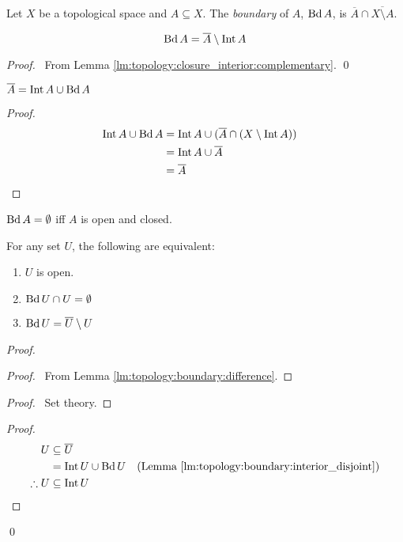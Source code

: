 \begin{df}[Boundary]
  Let $X$ be a topological space and $A \subseteq X$. The \emph{boundary} of
  $A$, $\operatorname{Bd} A$, is $\overline{A} \cap \overline{X \setminus A}$.
\end{df}

\begin{lm}
  \label{lm:topology:boundary:difference}
  \[ \operatorname{Bd} A = \overline{A} \setminus \operatorname{Int} A \]
\end{lm}

\begin{proof}
  \pf\ From Lemma \ref{lm:topology:closure_interior:complementary}. \qed
\end{proof}

\begin{lm}
  \label{lm:topology:boundary:interior_disjoint}
  $\overline{A} = \operatorname{Int} A \cup \operatorname{Bd} A$
\end{lm}

\begin{proof}
  \pf
  \begin{align*}
    \operatorname{Int} A \cup \operatorname{Bd} A & = \operatorname{Int} A \cup (\overline{A} \cap (X \setminus \operatorname{Int}
    A))
    \\
    & = \operatorname{Int} A \cup \overline{A} \\
    & = \overline{A} & \relax
  \end{align*}
\end{proof}

\begin{cor}
  $\operatorname{Bd} A = \emptyset$ iff $A$ is open and closed.
\end{cor}

\begin{lm}
  For any set $U$, the following are equivalent:
  \begin{enumerate}
    \item $U$ is open.
    \item $\operatorname{Bd} U \cap U = \emptyset$
    \item $\operatorname{Bd} U = \overline{U} \setminus U$
  \end{enumerate}
\end{lm}

\begin{proof}
  \pf
  \begin{proof}
    \pf\ From Lemma \ref{lm:topology:boundary:difference}.
  \end{proof}
  \begin{proof}
    \pf\ Set theory.
  \end{proof}
  \begin{proof}
    \pf
    \begin{align*}
      U & \subseteq \overline{U} \\
      & = \operatorname{Int} U \cup \operatorname{Bd} U & (\text{Lemma
        \ref{lm:topology:boundary:interior_disjoint}}) \\
      \therefore U & \subseteq \operatorname{Int} U
    \end{align*}
  \end{proof}
  \qed
\end{proof}

